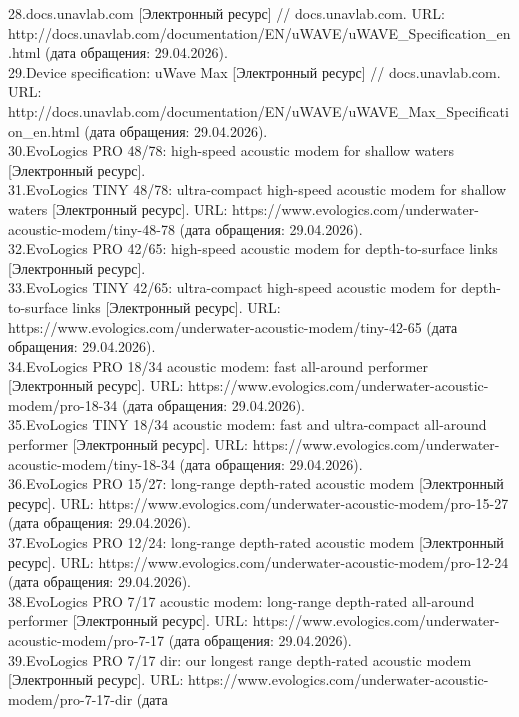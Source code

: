 {28.docs.unavlab.com {[}Электронный ресурс{]} // docs.unavlab.com. URL:
http://docs.unavlab.com/documentation/EN/uWAVE/uWAVE\_Specification\_en.html
(дата обращения: 29.04.2026).\\
29.Device specification: uWave Max {[}Электронный ресурс{]} //
docs.unavlab.com. URL:
http://docs.unavlab.com/documentation/EN/uWAVE/uWAVE\_Max\_Specification\_en.html
(дата обращения: 29.04.2026).\\
30.EvoLogics PRO 48/78: high-speed acoustic modem for shallow waters
{[}Электронный ресурс{]}.\\
31.EvoLogics TINY 48/78: ultra-compact high-speed acoustic modem for
shallow waters {[}Электронный ресурс{]}. URL:
https://www.evologics.com/underwater-acoustic-modem/tiny-48-78 (дата
обращения: 29.04.2026).\\
32.EvoLogics PRO 42/65: high-speed acoustic modem for depth-to-surface
links {[}Электронный ресурс{]}.\\
33.EvoLogics TINY 42/65: ultra-compact high-speed acoustic modem for
depth-to-surface links {[}Электронный ресурс{]}. URL:
https://www.evologics.com/underwater-acoustic-modem/tiny-42-65 (дата
обращения: 29.04.2026).\\
34.EvoLogics PRO 18/34 acoustic modem: fast all-around performer
{[}Электронный ресурс{]}. URL:
https://www.evologics.com/underwater-acoustic-modem/pro-18-34 (дата
обращения: 29.04.2026).\\
35.EvoLogics TINY 18/34 acoustic modem: fast and ultra-compact
all-around performer {[}Электронный ресурс{]}. URL:
https://www.evologics.com/underwater-acoustic-modem/tiny-18-34 (дата
обращения: 29.04.2026).\\
36.EvoLogics PRO 15/27: long-range depth-rated acoustic modem
{[}Электронный ресурс{]}. URL:
https://www.evologics.com/underwater-acoustic-modem/pro-15-27 (дата
обращения: 29.04.2026).\\
37.EvoLogics PRO 12/24: long-range depth-rated acoustic modem
{[}Электронный ресурс{]}. URL:
https://www.evologics.com/underwater-acoustic-modem/pro-12-24 (дата
обращения: 29.04.2026).\\
38.EvoLogics PRO 7/17 acoustic modem: long-range depth-rated all-around
performer {[}Электронный ресурс{]}. URL:
https://www.evologics.com/underwater-acoustic-modem/pro-7-17 (дата
обращения: 29.04.2026).\\
39.EvoLogics PRO 7/17 dir: our longest range depth-rated acoustic modem
{[}Электронный ресурс{]}. URL:
https://www.evologics.com/underwater-acoustic-modem/pro-7-17-dir (дата
}
